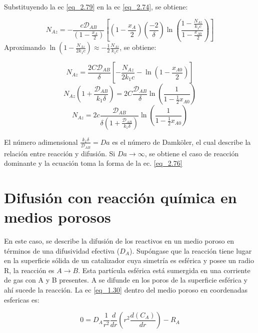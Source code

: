 Substituyendo la ec \eqref{eq_2.79} en la ec \eqref{eq_2.74}, se obtiene:

\begin{equation*}
    N_{Az}=-\frac{c\mathscr{D}_{AB}}{(1-\frac{x_A}{2})}\left[\left(1-\frac{x_A}{2}\right)\left(\frac{-2}{\delta}\right)\ln \left(\frac{1-\frac{N_{Az}}{k_1c}}{1-\frac{x_{A0}}{2}}\right)\right]
\end{equation*}
Aproximando $\ln (1-\frac{N_{Az}}{2k_1c})\approx -\frac{1}{2}\frac{N_{Az}}{k_1c}$, se obtiene:

\begin{equation*}
   N_{Az}=\frac{2C\mathscr{D}_{AB}}{\delta}\left[-\frac{N_{Az}}{2k_1c}-\ln \left(1-\frac{x_{A0}}{2}\right)\right] 
\end{equation*}
\begin{equation*}
   N_{Az}\left(1+\frac{\mathscr{D}_{AB}}{k_1\delta}\right)=2C\frac{\mathscr{D}_{AB}}{\delta}\ln \left(\frac{1}{1-\frac{1}{2}x_{A0}}\right)  
\end{equation*}
\begin{equation}
   N_{Az}=2c\frac{\mathscr{D}_{AB}}{\delta(1+\frac{\mathscr{D}_{AB}}{k_1\delta})}\ln \left(\frac{1}{1-\frac{1}{2}x_{A0}}\right)  
\end{equation}

El número adimensional $\frac{k_1\delta}{\mathscr{D}_{AB}}=Da$ es el número de Damköler, el cual describe la relación entre reacción y difusión. Si $Da\rightarrow\infty$, se obtiene el caso de reacción dominante y la ecuación toma la forma de la ec. \eqref{eq_2.76}

\section{Difusión con reacción química en medios porosos}

En este caso, se describe la difusión de los reactivos en un medio poroso en términos de una difusividad efectiva ($D_A$). Supóngase que la reacción tiene lugar en la superficie sólida de un catalizador cuya simetría es esférica y posee un radio R, la reacción es $A\rightarrow B$. Esta partícula esférica está sumergida en una corriente de gas con A y B presentes. A se difunde en los poros de la superficie esférica y ahí sucede la reacción. La ec \eqref{eq_1.30} dentro del medio poroso en coordenadas esfericas es:

\begin{equation}
    0=D_A\frac{1}{r^2}\frac{d}{dr}(r^2\frac{d(C_A)}{dr})-R_A
    \label{eq_2.81}
\end{equation}

